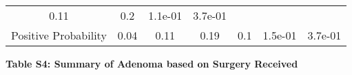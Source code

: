 \documentclass[12pt,]{article}
\begin{document}
\begin{longtable}[]{@{}ccccccc@{}}
\begin{minipage}[t]{0.15\columnwidth}
0.11\strut
\end{minipage} & \begin{minipage}[t]{0.09\columnwidth}\centering\strut
0.2\strut
\end{minipage} & \begin{minipage}[t]{0.07\columnwidth}\centering\strut
1.1e-01\strut
\end{minipage} & \begin{minipage}[t]{0.10\columnwidth}\centering\strut
3.7e-01\strut
\end{minipage}\tabularnewline
\begin{minipage}[t]{0.14\columnwidth}\centering\strut
Positive Probability\strut
\end{minipage} & \begin{minipage}[t]{0.16\columnwidth}\centering\strut
0.04\strut
\end{minipage} & \begin{minipage}[t]{0.10\columnwidth}\centering\strut
0.11\strut
\end{minipage} & \begin{minipage}[t]{0.15\columnwidth}\centering\strut
0.19\strut
\end{minipage} & \begin{minipage}[t]{0.09\columnwidth}\centering\strut
0.1\strut
\end{minipage} & \begin{minipage}[t]{0.07\columnwidth}\centering\strut
1.5e-01\strut
\end{minipage} & \begin{minipage}[t]{0.10\columnwidth}\centering\strut
3.7e-01\strut
\end{minipage}\tabularnewline
\bottomrule
\end{longtable}

\normalsize

\newpage

\textbf{Table S4: Summary of Adenoma based on Surgery Received}
\end{document}
